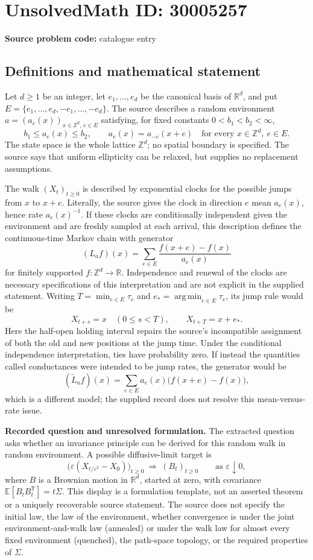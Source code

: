\documentclass[11pt]{article}
\newcommand{\Z}{\mathbb{Z}}
\newcommand{\R}{\mathbb{R}}
\begin{document}
\section*{UnsolvedMath ID: 30005257}
\textbf{Source problem code:} catalogue entry
\subsection{Definitions and mathematical statement}
Let \(d\geq 1\) be an integer, let \(e_1,\ldots,e_d\) be the canonical basis of \(\R^d\), and put \(E=\{e_1,\ldots,e_d,-e_1,\ldots,-e_d\}\). The source describes a random environment \(a=(a_e(x))_{x\in\Z^d,\,e\in E}\) satisfying, for fixed constants \(0<b_1<b_2<\infty\),
\[
 b_1\leq a_e(x)\leq b_2,
 \qquad a_e(x)=a_{-e}(x+e)
 \quad\text{for every }x\in\Z^d,\ e\in E.
\]
The state space is the whole lattice \(\Z^d\); no spatial boundary is specified. The source says that uniform ellipticity can be relaxed, but supplies no replacement assumptions.

The walk \((X_t)_{t\geq0}\) is described by exponential clocks for the possible jumps from \(x\) to \(x+e\). Literally, the source gives the clock in direction \(e\) mean \(a_e(x)\), hence rate \(a_e(x)^{-1}\). If these clocks are conditionally independent given the environment and are freshly sampled at each arrival, this description defines the continuous-time Markov chain with generator
\[
 (L_a f)(x)=\sum_{e\in E}\frac{f(x+e)-f(x)}{a_e(x)}
\]
for finitely supported \(f:\Z^d\to\R\). Independence and renewal of the clocks are necessary specifications of this interpretation and are not explicit in the supplied statement. Writing \(T=\min_{e\in E}\tau_e\) and \(e_* =\operatorname*{arg\,min}_{e\in E}\tau_e\), its jump rule would be
\[
 X_{t+s}=x\quad(0\leq s<T),\qquad X_{t+T}=x+e_*.
\]
Here the half-open holding interval repairs the source's incompatible assignment of both the old and new positions at the jump time. Under the conditional independence interpretation, ties have probability zero. If instead the quantities called conductances were intended to be jump rates, the generator would be
\[
 (\widetilde L_a f)(x)=\sum_{e\in E}a_e(x)\bigl(f(x+e)-f(x)\bigr),
\]
which is a different model; the supplied record does not resolve this mean-versus-rate issue.

\textbf{Recorded question and unresolved formulation.} The extracted question asks whether an invariance principle can be derived for this random walk in random environment. A possible diffusive-limit target is
\[
 \bigl(\varepsilon(X_{t/\varepsilon^2}-X_0)\bigr)_{t\geq0}
 \ \Longrightarrow\ (B_t)_{t\geq0}
 \qquad\text{as }\varepsilon\downarrow0,
\]
where \(B\) is a Brownian motion in \(\R^d\), started at zero, with covariance \(\mathbb E[B_tB_t^{\mathsf T}]=t\Sigma\). This display is a formulation template, not an asserted theorem or a uniquely recoverable source statement. The source does not specify the initial law, the law of the environment, whether convergence is under the joint environment-and-walk law (annealed) or under the walk law for almost every fixed environment (quenched), the path-space topology, or the required properties of \(\Sigma\).
\end{document}
